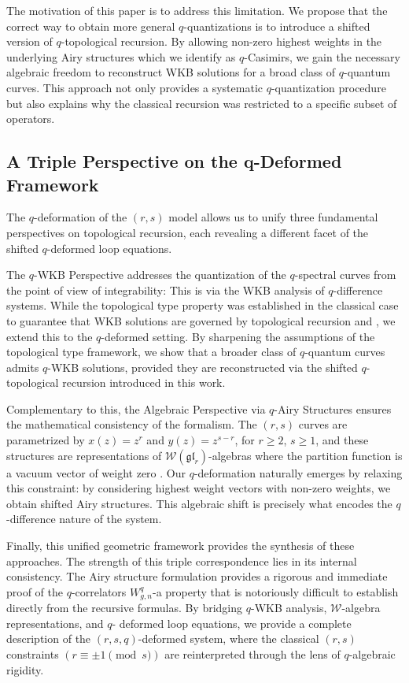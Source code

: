 \documentclass[reqno,11pt]{amsart}
\theoremstyle{plain}
\theoremstyle{definition}
\theoremstyle{remark}
\numberwithin{equation}{section}
\newcommand{\1}{\mathds{1}}
\newcommand{\2}{\frac{1}{2}}
\begin{document}
	The motivation of this paper is to address this limitation. We propose that the correct way to obtain more general $q$-quantizations is to introduce a shifted version of $q$-topological recursion. By allowing non-zero highest weights in the underlying Airy structures which we identify as $q$-Casimirs, we gain the necessary algebraic freedom to reconstruct WKB solutions for a broad class of $q$-quantum curves. This approach not only provides a systematic $q$-quantization procedure but also explains why the classical recursion was restricted to a specific subset of operators.
	\subsection{A Triple Perspective on the q-Deformed Framework}
	The $q$-deformation of the $(r,s)$ model allows us to unify three fundamental perspectives on topological recursion, each revealing a different facet of the shifted $q$-deformed loop equations.
	
	The $q$-WKB Perspective addresses the quantization of the $q$-spectral curves from the point of view of integrability: This is  via the WKB analysis of $q$-difference systems. While the topological type property was established in the classical case to guarantee that WKB solutions are governed by topological recursion \cite{BBE15,BEM17} and \cite{BEM18,IMS18}, we extend this to the $q$-deformed setting. By sharpening the assumptions of the topological type framework, we show that a broader class of $q$-quantum curves admits $q$-WKB solutions, provided they are reconstructed via the shifted $q$-topological recursion introduced in this work.
	
	Complementary to this, the Algebraic Perspective via $q$-Airy Structures ensures the mathematical consistency of the formalism. The $(r,s)$ curves are parametrized by $x(z)=z^r$ and $y(z)=z^{s-r}$, for 
	$ r \geq 2$, $ s \geq 1$, and  these structures are representations of $\mathcal{W}(\mathfrak{gl}_r)$-algebras where the partition function is a vacuum vector of weight zero \cite{BBCCN18}. Our $q$-deformation naturally emerges by relaxing this constraint: by considering highest weight vectors with non-zero weights, we obtain shifted Airy structures. This algebraic shift is precisely what encodes the $q$-difference nature of the system.
	
	Finally, this unified geometric framework provides the synthesis of these approaches. The strength of this triple correspondence lies in its internal consistency. 
	The Airy structure formulation provides a rigorous and immediate proof of the $q$-correlators $W^q_{g,n}$-a property 
	that is notoriously difficult to establish directly from the recursive formulas. 
	By bridging $q$-WKB analysis, $\mathcal{W}$-algebra representations, and $q$- deformed loop equations, we provide a complete description of the $(r,s,q)$-deformed system, where the classical $(r,s)$ constraints $(r\equiv\pm 1 \pmod s)$ are reinterpreted through the lens of $q$-algebraic rigidity.
	
\end{document}
